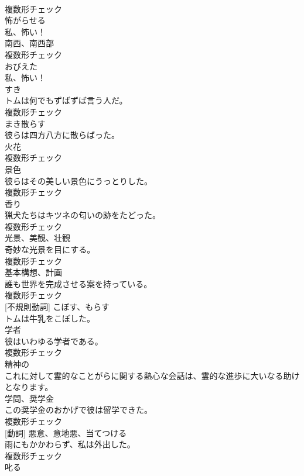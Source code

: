 \documentclass[8pt]{extreport}
\begin{document}
\begin{CJK}{UTF8}{min}
\\	複数形チェック
\\	[動詞]	怖がらせる	
\\	私、怖い！	
\\	[名詞]	南⻄、南⻄部	
\\	複数形チェック
\\	[形容詞]	おびえた	
\\	私、怖い！	
\\	[名詞]	すき	
\\	トムは何でもずばずば言う人だ。	
\\	複数形チェック
\\	[動詞]	まき散らす	
\\	彼らは四方八方に散らばった。	
\\	[名詞]	火花	
\\	複数形チェック
\\	[名詞]	景色	
\\	彼らはその美しい景色にうっとりした。	
\\	複数形チェック
\\	[名詞]	香り	
\\	猟犬たちはキツネの匂いの跡をたどった。	
\\	複数形チェック
\\	[名詞]	光景、美観、壮観	
\\	奇妙な光景を目にする。	
\\	複数形チェック
\\	[名詞]	基本構想、計画	
\\	誰も世界を完成させる案を持っている。	
\\	複数形チェック
\\	[動詞] [不規則動詞]	こぼす、もらす	
\\	トムは牛乳をこぼした。	
\\	[名詞]	学者	
\\	彼はいわゆる学者である。	
\\	複数形チェック
\\	[形容詞]	精神の	
\\	これに対して霊的なことがらに関する熱心な会話は、霊的な進歩に大いなる助けとなります。	
\\	[名詞]	学問、奨学金	
\\	この奨学金のおかげで彼は留学できた。	
\\	複数形チェック
\\	[名詞] [動詞]	悪意、意地悪、当てつける	
\\	雨にもかかわらず、私は外出した。	
\\	複数形チェック
\\	[動詞]	叱る	

\end{CJK}
\end{document}
